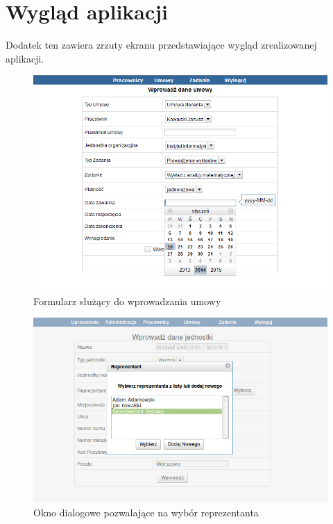\chapter{Wygląd aplikacji}
Dodatek ten zawiera zrzuty ekranu przedstawiające wygląd zrealizowanej aplikacji.

\begin{figure}[]
    \begin{center}
	\includegraphics[scale=1,angle=-90]{img/screen1.png}
	\caption{Formularz służący do wprowadzania umowy}
	\label{screen1}
    \end{center}
\end{figure}

\begin{figure}[]
    \begin{center}
	\includegraphics[scale=1,angle=-90]{img/screen2.png}
	\caption{Okno dialogowe pozwalające na wybór reprezentanta}
	\label{screen2}
    \end{center}
\end{figure}

